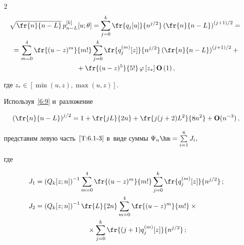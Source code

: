 \begin{multicols}{2}
 \begin{multline*}


   \sqrt{\fr{n}{n-L}}\, p_{n-L}^{[k]}[u;\theta]=


  \sum\limits_{j=0}^k \fr{q_j[u]}{n^{j/2}}\left(\fr{n}{n-L}\right)^


  {(j+1)/2}={}


\\ {}  =


  \sum\limits_{m=0}^4 \fr{(u-z)^m}{m!}\sum_{j=0}^k \fr{q_j^{(m)}[z]}{n^{j/2}}


  \left(\fr{n}{n-L}\right)^{(j+1)/2}+{}\\


  {}+


  \fr{(u-z)^5}{5!}\, \varphi\left[z_*\right] \Op\left(1\right),




 \end{multline*}


 где $z_*\in \left[\min (u,z),\max (u,z) \right]$.





 Используя~\eqref{6:9} и~разложение


 \begin{equation*}


\left( \fr{n}{n-L}\right)^{j/2}


  = 1+\fr{jL}{2n}+\fr{j(j+2)L^2}{8n^2}+\Op(n^{-3})\,,


 \end{equation*}


 представим левую часть~$\eqref{T:6.1-3}$ в~виде суммы $\Psi_n\hm=\sum\limits_{i=1}^6 J_i,$


 где


 \begin{align*}


 J_1&=\left(Q_k[z;n]\right)^{-1}\sum\limits_{m=0}^4 \fr{(u-z)^m}{m!}\sum_{j=0}^k \fr{q_j^{(m)}[z]}{n^{j/2}}\,;


\\


 J_2&=\left(Q_k[z;n]\right)^{-1}\fr{L}{2n}\sum\limits_{m=0}^4 


 \fr{(u-z)^m}{m!}\times{}\\


 &\hspace*{27mm}{}\times \sum\limits_{j=0}^k \fr{(j+1)q_j^{(m)}[z]}{n^{j/2}}\,;


\\



\end{align*}
\end{multicols}
